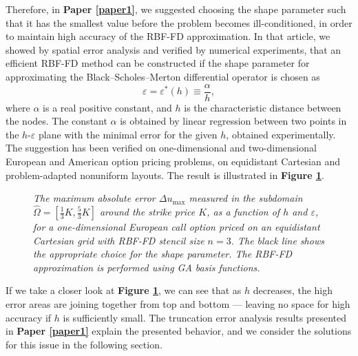 \documentclass{UUThesisTemplate}
\begin{document}
\par
Therefore, in \textbf{Paper \ref{paper1}}, we suggested choosing the shape parameter such that it has the smallest value before the problem becomes ill-conditioned, in order to maintain high accuracy of the RBF-FD approximation. In that article, we showed by spatial error analysis and verified by numerical experiments, that an efficient RBF-FD method can be constructed if the shape parameter for approximating the Black--Scholes--Merton differential operator is chosen as 
\begin{equation}
\varepsilon=\varepsilon^*(h)\equiv\frac{\alpha}{h},
\label{eq:shape}
\end{equation}
where $\alpha$ is a real positive constant, and $h$ is the characteristic distance between the nodes. The constant $\alpha$ is obtained by linear regression between two points in the $h$-$\varepsilon$ plane with the minimal error for the given $h$, obtained experimentally. The suggestion has been verified on one-dimensional and two-dimensional European and American option pricing problems, on equidistant Cartesian and problem-adapted nonuniform layouts. The result is illustrated in \textbf{Figure \ref{fig:contour1}}.
\begin{figure}[H]
\centering


\caption{\emph{The maximum absolute error $\Delta u_{\max}$ measured in the subdomain $\hat\Omega=[\frac{1}{3}K,\frac{5}{3}K]$ around the strike price $K$, as a function of $h$ and $\varepsilon$, for a one-dimensional European call option priced on an equidistant Cartesian grid with RBF-FD stencil size $n=3$. The black line shows the appropriate choice for the shape parameter. The RBF-FD approximation is performed using GA basis functions.}}
\label{fig:contour1}
\end{figure}
If we take a closer look at \textbf{Figure \ref{fig:contour1}}, we can see that as $h$ decreases, the high error areas are joining together from top and bottom --- leaving no space for high accuracy if $h$ is sufficiently small. The truncation error analysis results presented in \textbf{Paper \ref{paper1}} explain the presented behavior, and we consider the solutions for this issue in the following section. 
%





%





%
\end{document}
